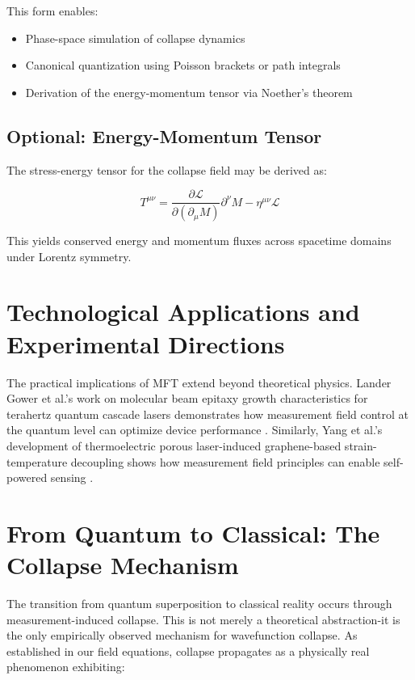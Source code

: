 This form enables:

\begin{itemize}
  \item Phase-space simulation of collapse dynamics
  \item Canonical quantization using Poisson brackets or path integrals
  \item Derivation of the energy-momentum tensor via Noether's theorem
\end{itemize}

\subsection{Optional: Energy-Momentum Tensor}

The stress-energy tensor for the collapse field may be derived as:

\begin{equation}
T^{\mu\nu} = \frac{\partial \mathcal{L}}{\partial(\partial_\mu M)} \partial^\nu M - \eta^{\mu\nu} \mathcal{L}
\end{equation}

This yields conserved energy and momentum fluxes across spacetime domains under Lorentz symmetry.


\section{Technological Applications and Experimental Directions}

The practical implications of MFT extend beyond theoretical physics. Lander Gower et al.'s work on molecular beam epitaxy growth characteristics for terahertz quantum cascade lasers demonstrates how measurement field control at the quantum level can optimize device performance \cite{lander_gower_exploring_2024}. Similarly, Yang et al.'s development of thermoelectric porous laser-induced graphene-based strain-temperature decoupling shows how measurement field principles can enable self-powered sensing \cite{yang2025}.


\section{From Quantum to Classical: The Collapse Mechanism}

The transition from quantum superposition to classical reality occurs through measurement-induced collapse. This is not merely a theoretical abstraction-it is the only empirically observed mechanism for wavefunction collapse. As established in our field equations, collapse propagates as a physically real phenomenon exhibiting:

